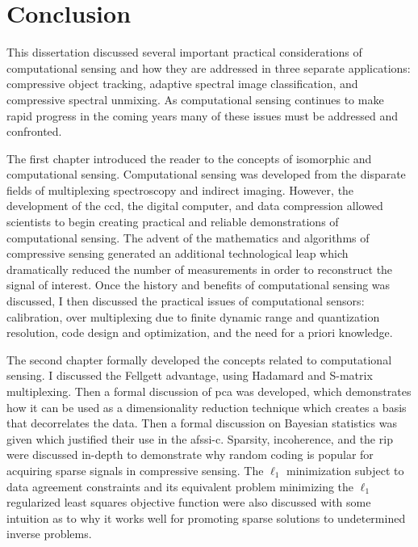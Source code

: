 \chapter{Conclusion}\label{chap:Conclusion}

This dissertation discussed several important practical considerations of computational sensing and how they are addressed in three separate applications: compressive object tracking, adaptive spectral image classification, and compressive spectral unmixing. As computational sensing continues to make rapid progress in the coming years many of these issues must be addressed and confronted. 

The first chapter introduced the reader to the concepts of isomorphic and computational sensing. Computational sensing was developed from the disparate fields of multiplexing spectroscopy and indirect imaging. However, the development of the \gls{ccd}, the digital computer, and data compression allowed scientists to begin creating practical and reliable demonstrations of computational sensing. The advent of the mathematics and algorithms of compressive sensing generated an additional technological leap which dramatically reduced the number of measurements in order to reconstruct the signal of interest. Once the history and benefits of computational sensing was discussed, I then discussed the practical issues of computational sensors: calibration, over multiplexing due to finite dynamic range and quantization resolution, code design and optimization, and the need for a priori knowledge.

The second chapter formally developed the concepts related to computational sensing. I discussed the Fellgett advantage, using Hadamard and S-matrix multiplexing. Then a formal discussion of \acrfull{pca} was developed, which demonstrates how it can be used as a dimensionality reduction technique which creates a basis that decorrelates the data. Then a formal discussion on Bayesian statistics was given which justified their use in the \gls{afssi-c}. Sparsity, incoherence, and the \acrfull{rip} were discussed in-depth to demonstrate why random coding is popular for acquiring sparse signals in compressive sensing. The $\ell_1$ minimization subject to data agreement constraints and its equivalent problem minimizing the $\ell_1$ regularized least squares objective function were also discussed with some intuition as to why it works well for promoting sparse solutions to undetermined inverse problems. 

